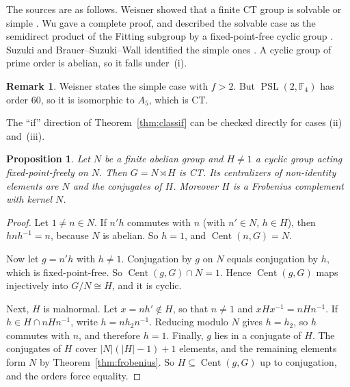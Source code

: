 \documentclass[12pt,letterpaper]{article}
\numberwithin{equation}{section}
\theoremstyle{plain}
\newtheorem{proposition}[theorem]{Proposition}
\theoremstyle{definition}
\newtheorem{remark}[theorem]{Remark}
\newcommand{\F}{\mathbb{F}}
\DeclareMathOperator{\Cent}{Cent}
\DeclareMathOperator{\PSL}{PSL}
\begin{document}
The sources are as follows. Weisner showed that a finite CT group is
solvable or simple \cite{We25}. Wu gave a complete proof, and described the
solvable case as the semidirect product of the Fitting subgroup by a
fixed-point-free cyclic group \cite{Wu98}. Suzuki and Brauer--Suzuki--Wall
identified the simple ones \cite{Su57,BSW58}. A cyclic group of prime order
is abelian, so it falls under~(i).

\begin{remark}\label{rem:weisnerk}
Weisner states the simple case with $f>2$. But $\PSL(2,\F_4)$ has order
$60$, so it is isomorphic to $A_5$, which is CT. 
\end{remark}

The ``if'' direction of Theorem~\ref{thm:classif} can be checked directly
for cases (ii) and~(iii).

\begin{proposition}\label{prop:frobct}
Let $N$ be a finite abelian group and $H\neq1$ a cyclic group acting
fixed-point-freely on $N$. Then $G=N\rtimes H$ is CT. Its centralizers of
non-identity elements are $N$ and the conjugates of $H$. Moreover $H$ is a
Frobenius complement with kernel $N$.
\end{proposition}

\begin{proof}
Let $1\neq n\in N$. If $n'h$ commutes with $n$ (with $n'\in N$, $h\in H$),
then $hnh^{-1}=n$, because $N$ is abelian. So $h=1$, and $\Cent(n,G)=N$.

Now let $g=n'h$ with $h\neq1$. Conjugation by $g$ on $N$ equals conjugation
by $h$, which is fixed-point-free. So $\Cent(g,G)\cap N=1$. Hence
$\Cent(g,G)$ maps injectively into $G/N\cong H$, and it is cyclic.

Next, $H$ is malnormal. Let $x=nh'\notin H$, so that $n\neq1$ and
$xHx^{-1}=nHn^{-1}$. If $h\in H\cap nHn^{-1}$, write $h=nh_2n^{-1}$.
Reducing modulo $N$ gives $h=h_2$, so $h$ commutes with $n$, and therefore
$h=1$. Finally, $g$ lies in a conjugate of $H$. The conjugates of $H$ cover
$|N|(|H|-1)+1$ elements, and the remaining elements form $N$ by
Theorem~\ref{thm:frobenius}. So $H\subseteq\Cent(g,G)$ up to conjugation,
and the orders force equality.
\end{proof}
\end{document}
